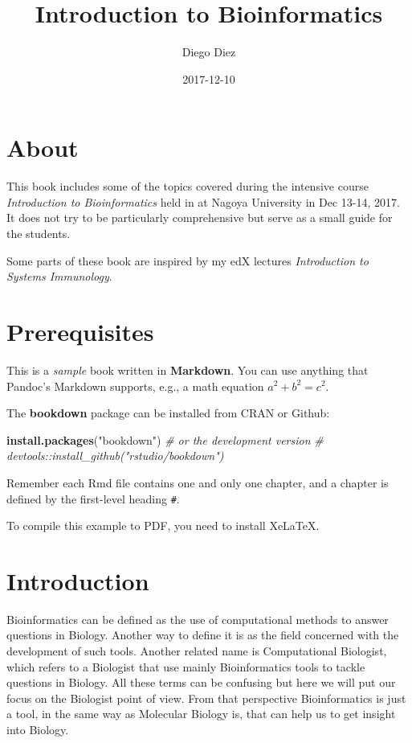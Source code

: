 \documentclass[]{book}
\title{Introduction to Bioinformatics}
\author{Diego Diez}
\date{2017-12-10}
\newenvironment{Shaded}{\begin{snugshade}}{\end{snugshade}}
\newcommand{\KeywordTok}[1]{\textcolor[rgb]{0.13,0.29,0.53}{\textbf{#1}}}
\newcommand{\StringTok}[1]{\textcolor[rgb]{0.31,0.60,0.02}{#1}}
\newcommand{\CommentTok}[1]{\textcolor[rgb]{0.56,0.35,0.01}{\textit{#1}}}
\newcommand{\NormalTok}[1]{#1}
\theoremstyle{definition}
\theoremstyle{definition}
\theoremstyle{definition}
\theoremstyle{remark}
\begin{document}
\maketitle

{
\setcounter{tocdepth}{1}
\tableofcontents
}
\chapter*{About}\label{about}

This book includes some of the topics covered during the intensive
course \emph{Introduction to Bioinformatics} held in at Nagoya
University in Dec 13-14, 2017. It does not try to be particularly
comprehensive but serve as a small guide for the students.

Some parts of these book are inspired by my edX lectures
\emph{Introduction to Systems Immunology}.

\chapter*{Prerequisites}\label{prerequisites}

This is a \emph{sample} book written in \textbf{Markdown}. You can use
anything that Pandoc's Markdown supports, e.g., a math equation
\(a^2 + b^2 = c^2\).

The \textbf{bookdown} package can be installed from CRAN or Github:

\begin{Shaded}
\begin{Highlighting}[]
\KeywordTok{install.packages}\NormalTok{(}\StringTok{"bookdown"}\NormalTok{)}
\CommentTok{# or the development version}
\CommentTok{# devtools::install_github("rstudio/bookdown")}
\end{Highlighting}
\end{Shaded}

Remember each Rmd file contains one and only one chapter, and a chapter
is defined by the first-level heading \texttt{\#}.

To compile this example to PDF, you need to install XeLaTeX.

\chapter{Introduction}\label{intro}

Bioinformatics can be defined as the use of computational methods to
answer questions in Biology. Another way to define it is as the field
concerned with the development of such tools. Another related name is
Computational Biologist, which refers to a Biologist that use mainly
Bioinformatics tools to tackle questions in Biology. All these terms can
be confusing but here we will put our focus on the Biologist point of
view. From that perspective Bioinformatics is just a tool, in the same
way as Molecular Biology is, that can help us to get insight into
Biology.
\end{document}

